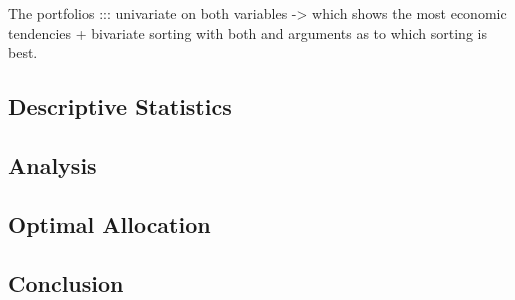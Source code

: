 

The portfolios ::: univariate on both variables -> which shows the most economic tendencies + bivariate sorting with both and arguments as to which sorting is best.


\subsection{Descriptive Statistics}



\subsection{Analysis}







\subsection{Optimal Allocation}





\subsection{Conclusion}
